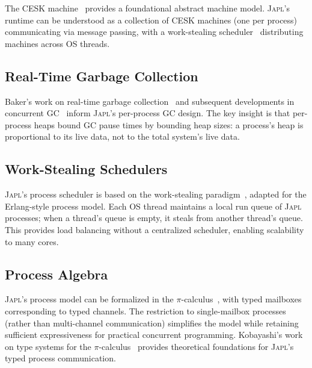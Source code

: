 \documentclass[11pt,twocolumn]{article}
\newcommand{\japl}{\textsc{Japl}}
\begin{document}
The CESK machine~\citep{felleisen1986cesk} provides a foundational abstract machine model.
\japl{}'s runtime can be understood as a collection of CESK machines (one per process) communicating via message passing, with a work-stealing scheduler~\citep{blumofe1999cilk} distributing machines across OS threads.

\subsection{Real-Time Garbage Collection}

Baker's work on real-time garbage collection~\citep{baker1978gc} and subsequent developments in concurrent GC~\citep{jones2016gc} inform \japl{}'s per-process GC design.
The key insight is that per-process heaps bound GC pause times by bounding heap sizes: a process's heap is proportional to its live data, not to the total system's live data.

\subsection{Work-Stealing Schedulers}

\japl{}'s process scheduler is based on the work-stealing paradigm~\citep{blumofe1999cilk}, adapted for the Erlang-style process model.
Each OS thread maintains a local run queue of \japl{} processes; when a thread's queue is empty, it steals from another thread's queue.
This provides load balancing without a centralized scheduler, enabling scalability to many cores.

\subsection{Process Algebra}

\japl{}'s process model can be formalized in the $\pi$-calculus~\citep{milner1999pi}, with typed mailboxes corresponding to typed channels.
The restriction to single-mailbox processes (rather than multi-channel communication) simplifies the model while retaining sufficient expressiveness for practical concurrent programming.
Kobayashi's work on type systems for the $\pi$-calculus~\citep{kobayashi2005type} provides theoretical foundations for \japl{}'s typed process communication.
\end{document}
